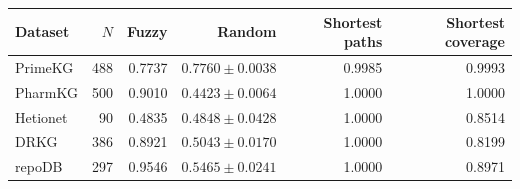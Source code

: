 \begin{tabular}{lrrrrr}
\toprule
Dataset & $N$ & Fuzzy & Random & Shortest paths & Shortest coverage \\
\midrule
PrimeKG & 488 & 0.7737 & $0.7760\pm0.0038$ & 0.9985 & 0.9993 \\
PharmKG & 500 & 0.9010 & $0.4423\pm0.0064$ & 1.0000 & 1.0000 \\
Hetionet & 90 & 0.4835 & $0.4848\pm0.0428$ & 1.0000 & 0.8514 \\
DRKG & 386 & 0.8921 & $0.5043\pm0.0170$ & 1.0000 & 0.8199 \\
repoDB & 297 & 0.9546 & $0.5465\pm0.0241$ & 1.0000 & 0.8971 \\
\bottomrule
\end{tabular}
